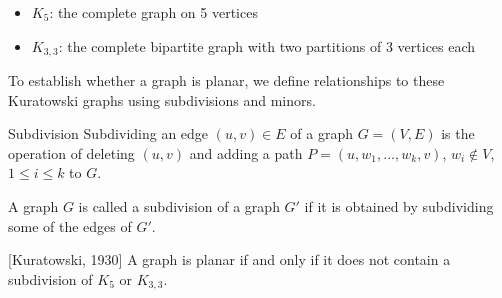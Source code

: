 \documentclass[a4paper, 11pt]{report}
\begin{document}
\begin{itemize}
    \item $K_5$: the complete graph on 5 vertices
    \item $K_{3,3}$: the complete bipartite graph with two partitions of 3 vertices each
\end{itemize}



To establish whether a graph is planar, we define relationships to these Kuratowski graphs using subdivisions and minors.

\begin{defframe}{Subdivision}{}
Subdividing an edge $(u,v) \in E$ of a graph $G=(V,E)$ is the operation of deleting $(u, v)$ and adding a path $P=(u,w_1,...,w_k,v)$, $w_i \notin V$, $1 \le i \le k$ to $G$. 

A graph $G$ is called a subdivision of a graph $G'$ if it is obtained by subdividing some of the edges of $G'$.
\begin{center}
\end{center}

\end{defframe}

\begin{thmframe}{[Kuratowski, 1930]}{}
A graph is planar if and only if it does not contain a subdivision of $K_5$ or $K_{3,3}$.
\end{thmframe}
\end{document}
